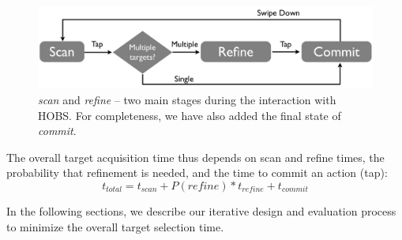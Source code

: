 \begin{figure}[t!]
\centering
\includegraphics[width=\columnwidth]{figures/interactionModel2.pdf}
\caption{{\em scan} and {\em refine} -- two main stages during the interaction with HOBS. For completeness, we have also added the final state of {\em commit}.} 
\label{fig:interaction}
\end{figure}

The overall target acquisition time thus depends on scan and refine times, the probability that refinement is needed, and the time to commit an action (tap):
\begin{equation}
t_{total}=t_{scan}+P(refine)*t_{refine}+t_{commit}
\label{eq:time}
\end{equation}

In the following sections, we describe our iterative design and evaluation process to minimize the overall target selection time.


